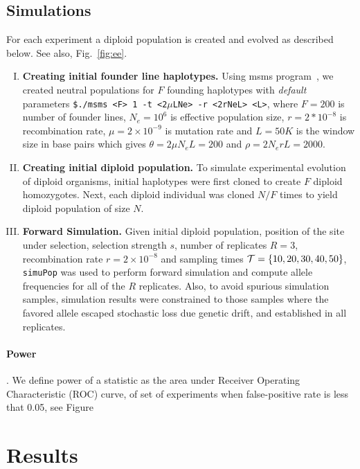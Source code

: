 \documentclass[11pt]{article}
\begin{document}
\subsection{Simulations}
For each experiment a diploid population is created and evolved as
described below. See also, Fig.~\ref{fig:ee}.
\begin{enumerate}[I.]
\item {\bf Creating initial founder line haplotypes.} Using msms
  program~\cite{ewing2010msms}, we created neutral populations for $F$ founding
  haplotypes with \emph{default} parameters \texttt{\$./msms <F> 1 -t
    <2$\mu$LNe> -r <2rNeL> <L>}, where $F=200$ is number of founder
  lines, $N_e=10^6$ is effective population size, $r=2*10^{-8}$ is
  recombination rate, $\mu=2\times 10^{-9}$ is mutation rate and
  $L=50K$ is the window size in base pairs which gives $\theta=2\mu
  N_eL=200$ and $\rho=2N_erL=2000$. 
  
\item{\bf Creating initial diploid population.} To simulate
  experimental evolution of diploid organisms, initial haplotypes were
  first cloned to create $F$ diploid homozygotes. Next, each diploid
  individual was cloned $N/F$ times to yield diploid population of
  size $N$.

\item{\bf Forward Simulation.} Given initial diploid population,
  position of the site under selection, selection strength $s$, number
  of replicates $R=3$, recombination rate $r=2\times10^{-8}$ and
  sampling times ${\cal T}=\{10,20,30,40,50\}$, \texttt{simuPop} was used
  to perform forward simulation and compute allele frequencies for all
  of the $R$ replicates. Also, to avoid spurious simulation samples,
  simulation results were constrained to those samples where the
  favored allele escaped stochastic loss due genetic drift, and
  established in all replicates.
\end{enumerate}

\paragraph{Power}.
We define power of a statistic as the area under
Receiver Operating Characteristic (ROC) curve, of set of experiments when 
false-positive
rate is less that 0.05, see Figure

\section{Results}
\end{document}
